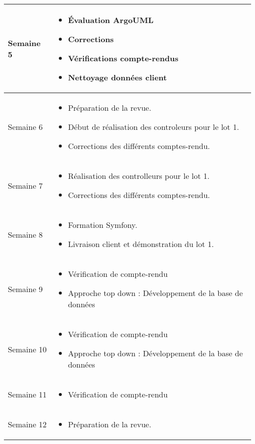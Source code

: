 \documentclass [a4paper] {article}
\begin{document}
\section*{\Kafui}

\centering
	\begin{longtable}{|>{\columncolor{gray!40}}p{2cm}|p{12cm}|}
	\hline
	Semaine 5 & \begin{itemize}
	\item Évaluation ArgoUML
	\item Corrections \DSICourt
	\item Vérifications compte-rendus
	\item Nettoyage données client
	\end{itemize}\\
	\hline
        Semaine 6 & \begin{itemize}
	\item Préparation de la revue.
	\item Début de réalisation des controleurs pour le lot 1.
    \item Corrections des différents comptes-rendu.  
	\end{itemize} \\
	\hline
        Semaine 7 & \begin{itemize}
	\item Réalisation des controlleurs pour le lot 1.
	\item Corrections des différents comptes-rendu.
	\end{itemize} \\
	Semaine 8 & \begin{itemize}
        \item Formation Symfony.
        \item Livraison client et démonstration du lot 1.  
	\end{itemize} \\
	\hline
	Semaine 9 & \begin{itemize}
        \item  Vérification de compte-rendu
        \item  Approche top down : Développement de la base de données
	\end{itemize} \\
	\hline
	Semaine 10 & \begin{itemize}
        \item Vérification de compte-rendu
        \item Approche top down : Développement de la base de données
	\end{itemize} \\
	\hline
	Semaine 11 & \begin{itemize}
	\item Vérification de compte-rendu
	\end{itemize} \\
	\hline
	Semaine 12 & \begin{itemize}
	\item Préparation de la revue.
	\end{itemize} \\
	\hline
\end{longtable}
\end{document}
